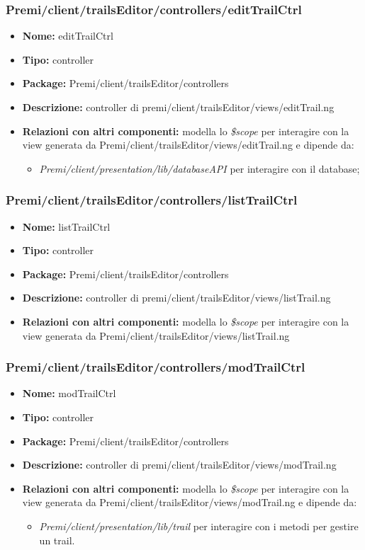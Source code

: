 \subsubsection{Premi/client/trailsEditor/controllers/editTrailCtrl}
\begin{itemize}
  \item[] \textbf{Nome:} editTrailCtrl
  \item[] \textbf{Tipo:} controller
  \item[] \textbf{Package:} Premi/client/trailsEditor/controllers
  \item[] \textbf{Descrizione:} controller di premi/client/trailsEditor/views/editTrail.ng
  \item[] \textbf{Relazioni con altri componenti:} modella lo \textit{\$scope} per interagire con la view generata da Premi/client/trailsEditor/views/editTrail.ng e dipende da:   
  \begin{itemize}
  \item[] \textit{Premi/client/presentation/lib/databaseAPI} per interagire con il database;    
  \end{itemize}
\end{itemize}
\subsubsection{Premi/client/trailsEditor/controllers/listTrailCtrl}
\begin{itemize}
  \item[] \textbf{Nome:} listTrailCtrl
  \item[] \textbf{Tipo:} controller
  \item[] \textbf{Package:} Premi/client/trailsEditor/controllers
  \item[] \textbf{Descrizione:} controller di premi/client/trailsEditor/views/listTrail.ng
  \item[] \textbf{Relazioni con altri componenti:} modella lo \textit{\$scope} per interagire con la view generata da Premi/client/trailsEditor/views/listTrail.ng
\end{itemize}
\subsubsection{Premi/client/trailsEditor/controllers/modTrailCtrl}
\begin{itemize}
  \item[] \textbf{Nome:} modTrailCtrl
  \item[] \textbf{Tipo:} controller
  \item[] \textbf{Package:} Premi/client/trailsEditor/controllers
  \item[] \textbf{Descrizione:} controller di premi/client/trailsEditor/views/modTrail.ng
  \item[] \textbf{Relazioni con altri componenti:} modella lo \textit{\$scope} per interagire con la view generata da Premi/client/trailsEditor/views/modTrail.ng e dipende da:
  \begin{itemize}
  	\item \textit{Premi/client/presentation/lib/trail} per interagire con i metodi per gestire un trail.
  \end{itemize}
\end{itemize}

